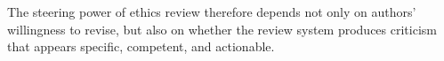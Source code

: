 \documentclass[sigconf,nonacm]{acmart} %
\begin{document}
The steering power of ethics review therefore depends not only on authors' willingness to revise, but also on whether the review system produces criticism that appears specific, competent, and actionable.






\end{document}
